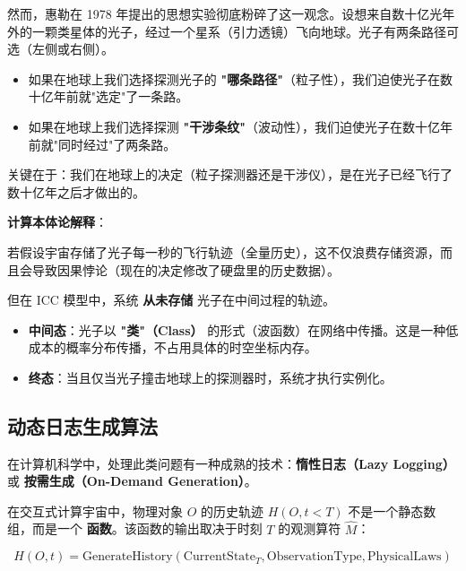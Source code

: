 然而，惠勒在 1978 年提出的思想实验彻底粉碎了这一观念。设想来自数十亿光年外的一颗类星体的光子，经过一个星系（引力透镜）飞向地球。光子有两条路径可选（左侧或右侧）。

\begin{itemize}
\item 如果在地球上我们选择探测光子的 \textbf{"哪条路径"}（粒子性），我们迫使光子在数十亿年前就"选定"了一条路。

\item 如果在地球上我们选择探测 \textbf{"干涉条纹"}（波动性），我们迫使光子在数十亿年前就"同时经过"了两条路。
\end{itemize}

关键在于：我们在地球上的决定（粒子探测器还是干涉仪），是在光子已经飞行了数十亿年之后才做出的。

\textbf{计算本体论解释}：

若假设宇宙存储了光子每一秒的飞行轨迹（全量历史），这不仅浪费存储资源，而且会导致因果悖论（现在的决定修改了硬盘里的历史数据）。

但在 ICC 模型中，系统 \textbf{从未存储} 光子在中间过程的轨迹。

\begin{itemize}
\item \textbf{中间态}：光子以 \textbf{"类"（Class）} 的形式（波函数）在网络中传播。这是一种低成本的概率分布传播，不占用具体的时空坐标内存。

\item \textbf{终态}：当且仅当光子撞击地球上的探测器时，系统才执行实例化。
\end{itemize}

\subsection{动态日志生成算法}

在计算机科学中，处理此类问题有一种成熟的技术：\textbf{惰性日志（Lazy Logging）} 或 \textbf{按需生成（On-Demand Generation）}。

\begin{definition}[动态历史]
在交互式计算宇宙中，物理对象 $O$ 的历史轨迹 $H(O, t<T)$ 不是一个静态数组，而是一个 \textbf{函数}。该函数的输出取决于时刻 $T$ 的观测算符 $\hat{M}$：

\begin{equation}
H(O, t) = \text{GenerateHistory}(\text{CurrentState}_T, \text{ObservationType}, \text{PhysicalLaws})
\end{equation}
\end{definition}

